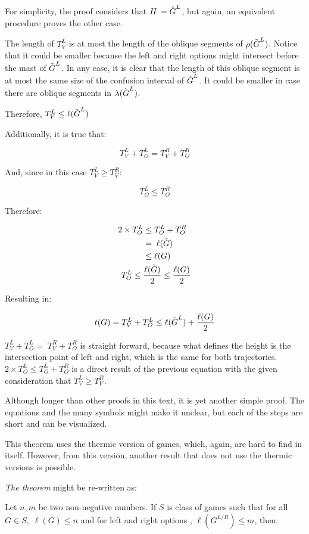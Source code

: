 For simplicity, the proof considers that $\mbox{$H\,$} = \tilde{\mbox{$G$}}^L$, but again, an equivalent procedure proves the other case.

The length of $T^L_V$ is at most the length of the oblique segments of $\rho(\tilde{\mbox{$G$}}^L)$. Notice that it could be smaller because the left and right options might intersect before the mast of $\tilde{\mbox{$G$}}^L$. In any case, it is clear that the length of this oblique segment is at most the same size of the confusion interval of $\tilde{\mbox{$G$}}^L$. It could be smaller in case there are oblique segments in $\lambda(\tilde{\mbox{$G$}}^L)$.

Therefore, $T^L_V \leq \ell(\tilde{\mbox{$G$}}^L)$

Additionally, it is true that:

$$
T^L_V + T^L_O = T^R_V+T^R_O
$$

And, since in this case $T^L_V \ge T^R_V$:

$$
T^L_O \leq T^R_O
$$

Therefore:

\begin{align*}
	2\times T^L_O &\leq T^L_O + T^R_O \\
	&= \;\ell(\tilde{\mbox{$G$}})\\
	&\leq \ell(\mbox{$G$})\\
	T^L_O \leq\; &\frac{\ell(\tilde{\mbox{$G$}})}{2} \leq \frac{\ell(\mbox{$G$})}{2}
\end{align*}

Resulting in:

$$
t(G) = T^L_V + T^L_O \leq \ell(\tilde{\mbox{$G$}}^L) + \frac{\ell(G)}{2}
$$

$T^L_V + T^L_O =\;T^R_V+T^R_O$ is straight forward, because what defines the height is the intersection point of left and right, which is the same for both trajectories. $2\times T^L_O \leq T^L_O + T^R_O$ is a direct result of the previous equation with the given consideration that $T^L_V \ge T^R_V$. 

Although longer than other proofs in this text, it is yet another simple proof. The equations and the many symbols might make it unclear, but each of the steps are short and can be visualized.

This theorem uses the thermic version of games, which, again, are hard to find in itself. However, from this version, another result that does not use the thermic versions is possible.

\textit{The theorem} might be re-written as:

Let $n, m$ be two non-negative numbers. If $S$ is class of games such that for all $G \in S,\;\ell(G) \leq n$ and for left and right options , $\ell(G^{L/R}) \leq m$, then:

